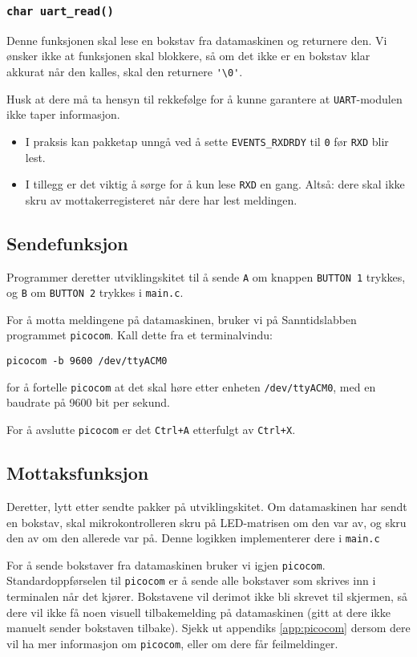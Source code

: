 \cprotect\subsubsection{\lstinline{char uart_read()}}

Denne funksjonen skal lese en bokstav fra datamaskinen og returnere den. Vi ønsker ikke at funksjonen skal blokkere, så om det ikke er en bokstav klar akkurat når den kalles, skal den returnere \verb|'\0'|.

Husk at dere må ta hensyn til rekkefølge for å kunne garantere at \verb|UART|-modulen ikke taper informasjon.

\begin{itemize}
    \item I praksis kan pakketap unngå ved å sette \verb|EVENTS_RXDRDY| til \verb|0| før \verb|RXD| blir lest.
    \item I tillegg er det viktig å sørge for å kun lese \verb|RXD| en gang. Altså: dere skal ikke skru av mottakerregisteret når dere har lest meldingen.
\end{itemize}
\subsection{Sendefunksjon}
Programmer deretter utviklingskitet til å sende \verb|A| om knappen \verb|BUTTON 1| trykkes, og \verb|B| om \verb|BUTTON 2| trykkes i \verb|main.c|.

For å motta meldingene på datamaskinen, bruker vi på Sanntidslabben programmet \verb|picocom|. Kall dette fra et terminalvindu:

\verb|picocom -b 9600 /dev/ttyACM0|

for å fortelle \verb|picocom| at det skal høre etter enheten \verb|/dev/ttyACM0|, med en baudrate på 9600 bit per sekund.

For å avslutte \verb|picocom| er det \verb|Ctrl+A| etterfulgt av \verb|Ctrl+X|.

\subsection{Mottaksfunksjon}
Deretter, lytt etter sendte pakker på utviklingskitet. Om datamaskinen har sendt en bokstav, skal mikrokontrolleren skru på LED-matrisen om den var av, og skru den av om den allerede var på. Denne logikken implementerer dere i \verb|main.c|

For å sende bokstaver fra datamaskinen bruker vi igjen \verb|picocom|. Standardoppførselen til \verb|picocom| er å sende alle bokstaver som skrives inn i terminalen når det kjører. Bokstavene vil derimot ikke bli skrevet til skjermen, så dere vil ikke få noen visuell tilbakemelding på datamaskinen (gitt at dere ikke manuelt sender bokstaven tilbake). Sjekk ut appendiks \ref{app:picocom} dersom dere vil ha mer informasjon om \verb|picocom|, eller om dere får feilmeldinger.


